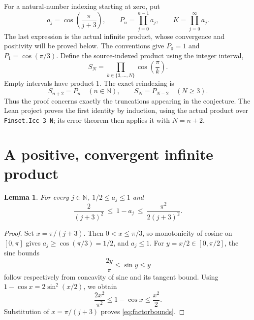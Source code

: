 \documentclass[10pt,letterpaper]{article}
\newtheorem{lemma}{Lemma}
\newcommand{\N}{\mathbb{N}}
\begin{document}
For a natural-number indexing starting at zero, put
\begin{equation}\label{eq:objects}
a_j=\cos\left(\frac{\pi}{j+3}\right),\qquad
P_n=\prod_{j=0}^{n-1}a_j,\qquad
K=\prod_{j=0}^{\infty}a_j.
\end{equation}
The last expression is the actual infinite product, whose convergence and positivity will be proved below. The conventions give $P_0=1$ and $P_1=\cos(\pi/3)$. Define the source-indexed product using the integer interval,
\[
S_N=\prod_{k\in\{3,\ldots,N\}}\cos\left(\frac{\pi}{k}\right).
\]
Empty intervals have product $1$. The exact reindexing is
\begin{equation}\label{eq:shift}
S_{n+2}=P_n\quad(n\in\N),\qquad
S_N=P_{N-2}\quad(N\ge3).
\end{equation}
Thus the proof concerns exactly the truncations appearing in the conjecture. The Lean project proves the first identity by induction, using the actual product over \texttt{Finset.Icc 3 N}; its error theorem then applies it with $N=n+2$.

\section{A positive, convergent infinite product}
\begin{lemma}\label{lem:factors}
For every $j\in\N$, $1/2\le a_j\le1$ and
\begin{equation}\label{eq:factorbounds}
\frac{2}{(j+3)^2}\ \le\ 1-a_j\ \le\ \frac{\pi^2}{2(j+3)^2}.
\end{equation}
\end{lemma}
\begin{proof}
Set $x=\pi/(j+3)$. Then $0<x\le\pi/3$, so monotonicity of cosine on $[0,\pi]$ gives $a_j\ge\cos(\pi/3)=1/2$, and $a_j\le1$. For $y=x/2\in[0,\pi/2]$, the sine bounds
\[
\frac{2y}{\pi}\le\sin y\le y
\]
follow respectively from concavity of sine and its tangent bound. Using $1-\cos x=2\sin^2(x/2)$, we obtain
\[
\frac{2x^2}{\pi^2}\le1-\cos x\le\frac{x^2}{2}.
\]
Substitution of $x=\pi/(j+3)$ proves \eqref{eq:factorbounds}.
\end{proof}
\end{document}
